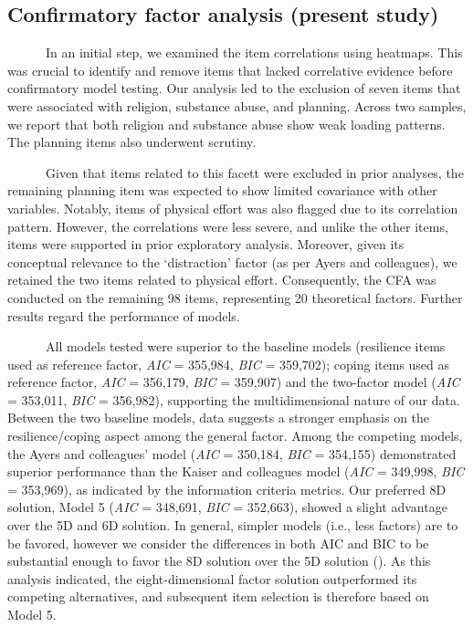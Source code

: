\documentclass[
  man,floatsintext]{apa7}
\begin{document}
\subsection{Confirmatory factor analysis (present study)}\label{confirmatory-factor-analysis-present-study}

~~~~~~In an initial step, we examined the item correlations using heatmaps. This was crucial to identify and remove items that lacked correlative evidence before confirmatory model testing. Our analysis led to the exclusion of seven items that were associated with religion, substance abuse, and planning. Across two samples, we report that both religion and substance abuse show weak loading patterns. The planning items also underwent scrutiny.

~~~~~~Given that items related to this facett were excluded in prior analyses, the remaining planning item was expected to show limited covariance with other variables. Notably, items of physical effort was also flagged due to its correlation pattern. However, the correlations were less severe, and unlike the other items, items were supported in prior exploratory analysis. Moreover, given its conceptual relevance to the `distraction' factor (as per Ayers and colleagues), we retained the two items related to physical effort. Consequently, the CFA was conducted on the remaining 98 items, representing 20 theoretical factors. Further results regard the performance of models.

~~~~~~All models tested were superior to the baseline models (resilience items used as reference factor, \emph{AIC} = 355,984, \emph{BIC} = 359,702); coping items used as reference factor, \emph{AIC} = 356,179, \emph{BIC} = 359,907) and the two-factor model (\emph{AIC} = 353,011, \emph{BIC} = 356,982), supporting the multidimensional nature of our data. Between the two baseline models, data suggests a stronger emphasis on the resilience/coping aspect among the general factor. Among the competing models, the Ayers and colleagues' model (\emph{AIC} = 350,184, \emph{BIC} = 354,155) demonstrated superior performance than the Kaiser and colleagues model (\emph{AIC} = 349,998, \emph{BIC} = 353,969), as indicated by the information criteria metrics. Our preferred 8D solution, Model 5 (\emph{AIC} = 348,691, \emph{BIC} = 352,663), showed a slight advantage over the 5D and 6D solution. In general, simpler models (i.e., less factors) are to be favored, however we consider the differences in both AIC and BIC to be substantial enough to favor the 8D solution over the 5D solution (). As this analysis indicated, the eight-dimensional factor solution outperformed its competing alternatives, and subsequent item selection is therefore based on Model 5.
\end{document}
